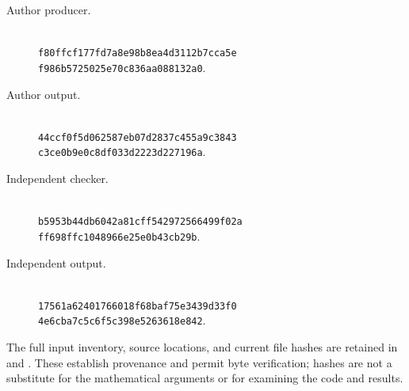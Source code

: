 \begin{description}
\item[Author producer.]
\\
\texttt{f80ffcf177fd7a8e98b8ea4d3112b7cca5e}\\
\texttt{f986b5725025e70c836aa088132a0}.
\item[Author output.]
\\
\texttt{44ccf0f5d062587eb07d2837c455a9c3843}\\
\texttt{c3ce0b9e0c8df033d2223d227196a}.
\item[Independent checker.]
\\
\texttt{b5953b44db6042a81cff542972566499f02a}\\
\texttt{ff698ffc1048966e25e0b43cb29b}.
\item[Independent output.]
\\
\texttt{17561a62401766018f68baf75e3439d33f0}\\
\texttt{4e6cba7c5c6f5c398e5263618e842}.
\end{description}

The full input inventory, source locations, and current file hashes
are retained in  and
. These establish provenance and permit
byte verification; hashes are not a substitute for the mathematical
arguments or for examining the code and results.
